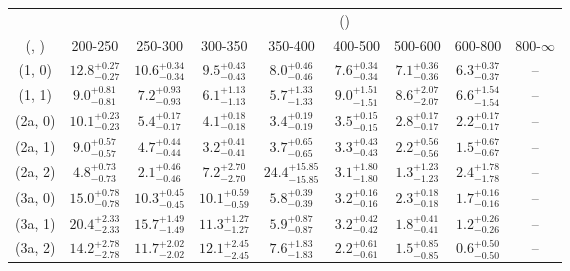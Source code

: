\begin{table}[h!]
\tiny
\centering
{}
\begin{tabular}
{ccccccccc}
	\hline\hline
&	& \multicolumn{8}{c}{\scalht (\gev)} \\ 
	 (\njet,  \nb) & 200-250 & 250-300 & 300-350 & 350-400 & 400-500 & 500-600 & 600-800 & 800-$\infty$ \\ [0.8ex] 
\hline
	(1, 0) & $12.8^{+ 0.27 }_{- 0.27 }$ & $10.6^{+ 0.34 }_{- 0.34 }$ & $9.5^{+ 0.43 }_{- 0.43 }$ & $8.0^{+ 0.46 }_{- 0.46 }$ & $7.6^{+ 0.34 }_{- 0.34 }$ & $7.1^{+ 0.36 }_{- 0.36 }$ & $6.3^{+ 0.37 }_{- 0.37 }$ & -- \\[0.5ex] 
	(1, 1) & $9.0^{+ 0.81 }_{- 0.81 }$ & $7.2^{+ 0.93 }_{- 0.93 }$ & $6.1^{+ 1.13 }_{- 1.13 }$ & $5.7^{+ 1.33 }_{- 1.33 }$ & $9.0^{+ 1.51 }_{- 1.51 }$ & $8.6^{+ 2.07 }_{- 2.07 }$ & $6.6^{+ 1.54 }_{- 1.54 }$ & -- \\[0.5ex] 
	(2a, 0) & $10.1^{+ 0.23 }_{- 0.23 }$ & $5.4^{+ 0.17 }_{- 0.17 }$ & $4.1^{+ 0.18 }_{- 0.18 }$ & $3.4^{+ 0.19 }_{- 0.19 }$ & $3.5^{+ 0.15 }_{- 0.15 }$ & $2.8^{+ 0.17 }_{- 0.17 }$ & $2.2^{+ 0.17 }_{- 0.17 }$ & -- \\[0.5ex] 
	(2a, 1) & $9.0^{+ 0.57 }_{- 0.57 }$ & $4.7^{+ 0.44 }_{- 0.44 }$ & $3.2^{+ 0.41 }_{- 0.41 }$ & $3.7^{+ 0.65 }_{- 0.65 }$ & $3.3^{+ 0.43 }_{- 0.43 }$ & $2.2^{+ 0.56 }_{- 0.56 }$ & $1.5^{+ 0.67 }_{- 0.67 }$ & -- \\[0.5ex] 
	(2a, 2) & $4.8^{+ 0.73 }_{- 0.73 }$ & $2.1^{+ 0.46 }_{- 0.46 }$ & $7.2^{+ 2.70 }_{- 2.70 }$ & $24.4^{+ 15.85 }_{- 15.85 }$ & $3.1^{+ 1.80 }_{- 1.80 }$ & $1.3^{+ 1.23 }_{- 1.23 }$ & $2.4^{+ 1.78 }_{- 1.78 }$ & -- \\[0.5ex] 
	(3a, 0) & $15.0^{+ 0.78 }_{- 0.78 }$ & $10.3^{+ 0.45 }_{- 0.45 }$ & $10.1^{+ 0.59 }_{- 0.59 }$ & $5.8^{+ 0.39 }_{- 0.39 }$ & $3.2^{+ 0.16 }_{- 0.16 }$ & $2.3^{+ 0.18 }_{- 0.18 }$ & $1.7^{+ 0.16 }_{- 0.16 }$ & -- \\[0.5ex] 
	(3a, 1) & $20.4^{+ 2.33 }_{- 2.33 }$ & $15.7^{+ 1.49 }_{- 1.49 }$ & $11.3^{+ 1.27 }_{- 1.27 }$ & $5.9^{+ 0.87 }_{- 0.87 }$ & $3.2^{+ 0.42 }_{- 0.42 }$ & $1.8^{+ 0.41 }_{- 0.41 }$ & $1.2^{+ 0.26 }_{- 0.26 }$ & -- \\[0.5ex] 
	(3a, 2) & $14.2^{+ 2.78 }_{- 2.78 }$ & $11.7^{+ 2.02 }_{- 2.02 }$ & $12.1^{+ 2.45 }_{- 2.45 }$ & $7.6^{+ 1.83 }_{- 1.83 }$ & $2.2^{+ 0.61 }_{- 0.61 }$ & $1.5^{+ 0.85 }_{- 0.85 }$ & $0.6^{+ 0.50 }_{- 0.50 }$ & -- \\[0.5ex] 

\end{tabular}
\end{table}
